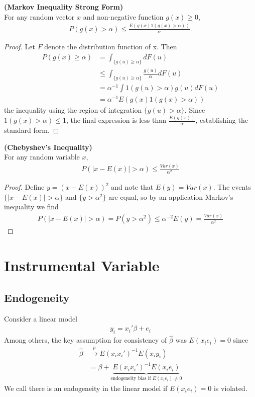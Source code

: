 \documentclass[11pt]{article} %
\theoremstyle{definition}
\numberwithin{defn}{subsection}
\numberwithin{thm}{subsection}
\numberwithin{ex}{subsection}
\newcommand{\plim}{\overset{p}{\rightarrow}}
\newcommand{\bhat}{\hat{\beta}}
\begin{document}
\begin{thm}\label{thm:markovineqstrong}
	\textbf{(Markov Inequality Strong Form)}\\
	For any random vector $x$ and non-negative function $g(x)\ge 0$,
	\begin{align*}
	P(g(x)>\alpha)\le\frac{E(g(x)1(g(x)>\alpha))}{\alpha}.
	\end{align*}
	
	\begin{proof}
		Let $F$ denote the distribution function of x. Then
		\begin{align*}
		P(g(x)\ge\alpha)&=\int_{\{g(u)\ge\alpha\}}dF(u)\\
		&\le\int_{\{g(u)\ge\alpha\}}\frac{g(u)}{\alpha}dF(u)\\
		&=\alpha^{-1}\int 1(g(u)>\alpha)g(u)dF(u)\\
		&=\alpha^{-1} E(g(x)1(g(x)>\alpha))
		\end{align*}
		the inequality using the region of integration $\{g(u)>\alpha\}$. Since $1(g(x)>\alpha)\le 1$, the final expression is less than $\frac{E(g(x))}{\alpha}$, establishing the standard form.
	\end{proof}
\end{thm}

\begin{thm}\label{thm:chebyshevineq}
	\textbf{(Chebyshev's Inequality)}\\
	For any random variable $x$,
	\begin{align*}
	P(|x-E(x)|>\alpha)\le\frac{Var(x)}{\alpha^2}
	\end{align*}
	
	\begin{proof}
		Define $y=(x-E(x))^2$ and note that $E(y)=Var(x)$. The events $\{|x-E(x)|>\alpha\}$ and $\{y>\alpha^2\}$ are equal, so by an application Markov's inequality we find
		\begin{align*}
		P(|x-E(x)|>\alpha)=P(y>\alpha^2)\le\alpha^{-2}E(y)=\frac{Var(x)}{\alpha^2}
		\end{align*}
	\end{proof}
\end{thm}
\clearpage

\section{Instrumental Variable}
\subsection{Endogeneity}
Consider a linear model
\begin{align}\label{eqn:IVstructural}
y_i=x_i'\beta+e_i
\end{align}
Among others, the key assumption for consistency of $\bhat$ was $E(x_ie_i)=0$ since
\begin{align*}
\bhat&\plim E(x_ix_i')^{-1}E(x_iy_i)\\
     &= \beta+\underbrace{E(x_ix_i')^{-1}E(x_ie_i)}_{\text{endogeneity bias if }E(x_ie_i)\neq0}
\end{align*}
We call there is an endogeneity in the linear model if $E(x_ie_i)=0$ is violated.
\end{document}
